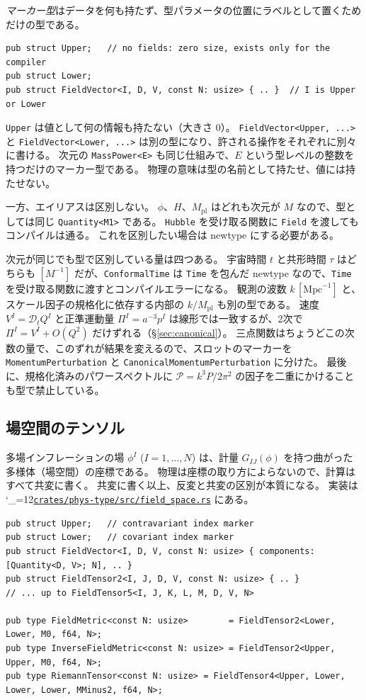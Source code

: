 \documentclass[a4paper,11pt]{ltjsarticle}
\newcommand{\Mpl}{M_{\mathrm{pl}}}
\newcommand{\code}[1]{\texttt{#1}}
\newcommand{\Dt}{\mathcal{D}_t}
\newcommand{\repourl}{https://github.com/inuverse44/phys-type-dev}
\newcommand{\reporev}{b1fea87}
\newcommand{\repo}{\begingroup\catcode`\_=12\relax\repoaux}
\newcommand{\repoaux}[1]{\href{\repourl/blob/\reporev/#1}{\nolinkurl{#1}}\endgroup}
\begin{document}
\emph{マーカー型}はデータを何も持たず、型パラメータの位置にラベルとして置くためだけの型である。
\begin{lstlisting}
pub struct Upper;   // no fields: zero size, exists only for the compiler
pub struct Lower;
pub struct FieldVector<I, D, V, const N: usize> { .. }  // I is Upper or Lower
\end{lstlisting}
\code{Upper} は値として何の情報も持たない（大きさ 0）。
\code{FieldVector<Upper, ...>} と \code{FieldVector<Lower, ...>} は別の型になり、許される操作をそれぞれに別々に書ける。
次元の \code{MassPower<E>} も同じ仕組みで、$E$ という型レベルの整数を持つだけのマーカー型である。
物理の意味は型の名前として持たせ、値には持たせない。

一方、エイリアスは区別しない。
$\phi$、$H$、$\Mpl$ はどれも次元が $M$ なので、型としては同じ \code{Quantity<M1>} である。
\code{Hubble} を受け取る関数に \code{Field} を渡してもコンパイルは通る。
これを区別したい場合は newtype にする必要がある。

次元が同じでも型で区別している量は四つある。
宇宙時間 $t$ と共形時間 $\tau$ はどちらも $[M^{-1}]$ だが、\code{ConformalTime} は \code{Time} を包んだ newtype なので、\code{Time} を受け取る関数に渡すとコンパイルエラーになる。
観測の波数 $k\,[\mathrm{Mpc}^{-1}]$ と、スケール因子の規格化に依存する内部の $k/\Mpl$ も別の型である。
速度 $V^I=\Dt Q^I$ と正準運動量 $\Pi^I=a^{-3}p^I$ は線形では一致するが、2次で $\Pi^I=V^I+O(Q^2)$ だけずれる（\S\ref{sec:canonical}）。
三点関数はちょうどこの次数の量で、このずれが結果を変えるので、スロットのマーカーを \code{MomentumPerturbation} と \code{CanonicalMomentumPerturbation} に分けた。
最後に、規格化済みのパワースペクトルに $\mathcal P=k^3P/2\pi^2$ の因子を二重にかけることも型で禁止している。

\subsection{場空間のテンソル}

多場インフレーションの場 $\phi^I$ ($I=1,\dots,N$) は、計量 $G_{IJ}(\phi)$ を持つ曲がった多様体（場空間）の座標である。
物理は座標の取り方によらないので、計算はすべて共変に書く。
共変に書く以上、反変と共変の区別が本質になる。
実装は \repo{crates/phys-type/src/field_space.rs} にある。

\begin{lstlisting}
pub struct Upper;   // contravariant index marker
pub struct Lower;   // covariant index marker
pub struct FieldVector<I, D, V, const N: usize> { components: [Quantity<D, V>; N], .. }
pub struct FieldTensor2<I, J, D, V, const N: usize> { .. }
// ... up to FieldTensor5<I, J, K, L, M, D, V, N>

pub type FieldMetric<const N: usize>        = FieldTensor2<Lower, Lower, M0, f64, N>;
pub type InverseFieldMetric<const N: usize> = FieldTensor2<Upper, Upper, M0, f64, N>;
pub type RiemannTensor<const N: usize> = FieldTensor4<Upper, Lower, Lower, Lower, MMinus2, f64, N>;
\end{lstlisting}
\end{document}
